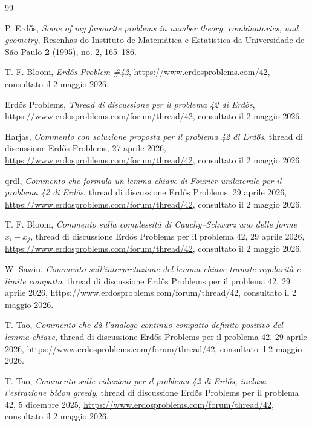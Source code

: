 \documentclass[11pt]{article}
\numberwithin{equation}{section}
\newcommand{\1}{\mathbf 1}
\begin{document}
\begin{thebibliography}{99}

P. Erd\H{o}s,
\emph{Some of my favourite problems in number theory, combinatorics, and geometry},
Resenhas do Instituto de Matem\'atica e Estat\'istica da Universidade de S\~ao Paulo
\textbf{2} (1995), no. 2, 165--186.

T. F. Bloom,
\emph{Erd\H{o}s Problem \#42},
\url{https://www.erdosproblems.com/42},
consultato il 2 maggio 2026.

Erd\H{o}s Problems,
\emph{Thread di discussione per il problema 42 di Erd\H{o}s},
\url{https://www.erdosproblems.com/forum/thread/42},
consultato il 2 maggio 2026.

Harjas,
\emph{Commento con soluzione proposta per il problema 42 di Erd\H{o}s},
thread di discussione Erd\H{o}s Problems, 27 aprile 2026,
\url{https://www.erdosproblems.com/forum/thread/42},
consultato il 2 maggio 2026.

qrdl,
\emph{Commento che formula un lemma chiave di Fourier unilaterale per il problema 42 di Erd\H{o}s},
thread di discussione Erd\H{o}s Problems, 29 aprile 2026,
\url{https://www.erdosproblems.com/forum/thread/42},
consultato il 2 maggio 2026.

T. F. Bloom,
\emph{Commento sulla complessità di Cauchy--Schwarz uno delle forme \(x_i-x_j\)},
thread di discussione Erd\H{o}s Problems per il problema 42, 29 aprile 2026,
\url{https://www.erdosproblems.com/forum/thread/42},
consultato il 2 maggio 2026.

W. Sawin,
\emph{Commento sull'interpretazione del lemma chiave tramite regolarità e limite compatto},
thread di discussione Erd\H{o}s Problems per il problema 42, 29 aprile 2026,
\url{https://www.erdosproblems.com/forum/thread/42},
consultato il 2 maggio 2026.

T. Tao,
\emph{Commento che dà l'analogo continuo compatto definito positivo del lemma chiave},
thread di discussione Erd\H{o}s Problems per il problema 42, 29 aprile 2026,
\url{https://www.erdosproblems.com/forum/thread/42},
consultato il 2 maggio 2026.

T. Tao,
\emph{Commento sulle riduzioni per il problema 42 di Erd\H{o}s, inclusa l'estrazione Sidon greedy},
thread di discussione Erd\H{o}s Problems per il problema 42, 5 dicembre 2025,
\url{https://www.erdosproblems.com/forum/thread/42},
consultato il 2 maggio 2026.


\end{thebibliography}
\end{document}
